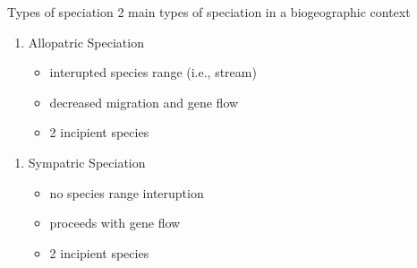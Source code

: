 \documentclass[t,10pt]{beamer}
\begin{document}
\begin{frame}[label={sec:orgheadline10}]{Types of speciation}
2 main types of speciation in a biogeographic context
\begin{enumerate}
\item Allopatric Speciation
\begin{itemize}
\item interupted species range (i.e., stream)
\item decreased migration and gene flow
\item 2 incipient species \vspace{0.25in}
\end{itemize}
\end{enumerate}
\begin{enumerate}[<+->]
\item Sympatric Speciation
\begin{itemize}
\item no species range interuption
\item proceeds with gene flow
\item 2 incipient species \vspace{0.25in}
\end{itemize}
\end{enumerate}
\end{frame}
\end{document}
